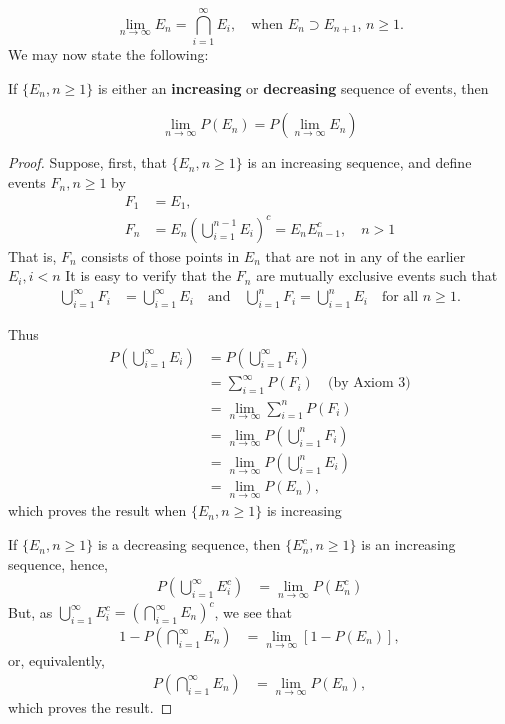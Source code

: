 \documentclass[lang=cn,10pt]{elegantbook}
\begin{document}
\[
\lim_{n \to \infty} E_n = \bigcap_{i=1}^{\infty} E_i, \quad \text{when } E_n \supset E_{n+1}, \, n \geq 1.
\]
\vspace{3pt}
We may now state the following:
\begin{proposition}
	If \(\{E_n, n \geq 1\}\) is either an \textbf{increasing} or \textbf{decreasing} sequence of events, then

\[
\lim_{n \to \infty} P(E_n) = P\left(\lim_{n \to \infty} E_n\right)
\]
\end{proposition}
\begin{proof}
	Suppose, first, that $\{E_n, n \geq 1\}$ is an increasing sequence, and define events $F_n, n \geq 1$ by
	\begin{align*}
	F_1 &= E_1, \\
	F_n &= E_n \left( \bigcup_{i=1}^{n-1} E_i \right)^c = E_n E_{n-1}^c, \quad n > 1
	\end{align*}
	That is, $F_n$ consists of those points in $E_n$ that are not in any of the earlier $E_i, i < n$ It is easy to verify that the $F_n$ are mutually exclusive events such that
	\begin{align*}
	\bigcup_{i=1}^{\infty} F_i &= \bigcup_{i=1}^{\infty} E_i \quad \text{and} \quad \bigcup_{i=1}^{n} F_i = \bigcup_{i=1}^{n} E_i \quad \text{for all } n \geq 1.
	\end{align*}
	
	Thus
	\begin{align*}
	P\left( \bigcup_{i=1}^{\infty} E_i \right) &= P\left( \bigcup_{i=1}^{\infty} F_i \right) \\
	&= \sum_{i=1}^{\infty} P(F_i) \quad \text{(by Axiom 3)} \\
	&= \lim_{n \to \infty} \sum_{i=1}^{n} P(F_i) \\
	&= \lim_{n \to \infty} P\left( \bigcup_{i=1}^{n} F_i \right) \\
	&= \lim_{n \to \infty} P\left( \bigcup_{i=1}^{n} E_i \right) \\
	&= \lim_{n \to \infty} P(E_n),
	\end{align*}
	which proves the result when $\{E_n, n \geq 1\}$ is increasing
	
	If $\{E_n, n \geq 1\}$ is a decreasing sequence, then $\{E_n^c, n \geq 1\}$ is an increasing sequence, hence,
	\begin{align*}
	P\left( \bigcup_{i=1}^{\infty} E_i^c \right) &= \lim_{n \to \infty} P(E_n^c)
	\end{align*}
	But, as $\bigcup_{i=1}^{\infty} E_i^c = \left( \bigcap_{i=1}^{\infty} E_n \right)^c$, we see that
	\begin{align*}
	1 - P\left( \bigcap_{i=1}^{\infty} E_n \right) &= \lim_{n \to \infty} [1 - P(E_n)],
	\end{align*}
	or, equivalently,
	\begin{align*}
	P\left( \bigcap_{i=1}^{\infty} E_n \right) &= \lim_{n \to \infty} P(E_n),
	\end{align*}
	which proves the result.
\end{proof}
\end{document}

